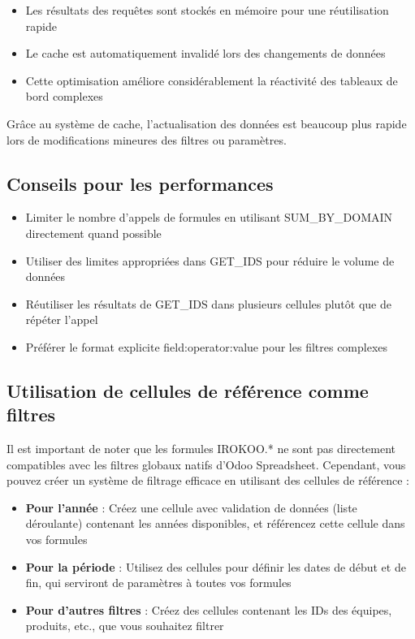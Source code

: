 \documentclass[12pt, a4paper]{article}
\begin{document}
\begin{itemize}
    \item Les résultats des requêtes sont stockés en mémoire pour une réutilisation rapide
    \item Le cache est automatiquement invalidé lors des changements de données
    \item Cette optimisation améliore considérablement la réactivité des tableaux de bord complexes
\end{itemize}

\begin{tip}
Grâce au système de cache, l'actualisation des données est beaucoup plus rapide lors de modifications mineures des filtres ou paramètres.
\end{tip}

\subsection{Conseils pour les performances}
\begin{itemize}
    \item Limiter le nombre d'appels de formules en utilisant SUM\_BY\_DOMAIN directement quand possible
    \item Utiliser des limites appropriées dans GET\_IDS pour réduire le volume de données
    \item Réutiliser les résultats de GET\_IDS dans plusieurs cellules plutôt que de répéter l'appel
    \item Préférer le format explicite field:operator:value pour les filtres complexes
\end{itemize}

\subsection{Utilisation de cellules de référence comme filtres}

Il est important de noter que les formules IROKOO.* ne sont pas directement compatibles avec les filtres globaux natifs d'Odoo Spreadsheet. Cependant, vous pouvez créer un système de filtrage efficace en utilisant des cellules de référence :

\begin{itemize}
    \item \textbf{Pour l'année} : Créez une cellule avec validation de données (liste déroulante) contenant les années disponibles, et référencez cette cellule dans vos formules
    \item \textbf{Pour la période} : Utilisez des cellules pour définir les dates de début et de fin, qui serviront de paramètres à toutes vos formules
    \item \textbf{Pour d'autres filtres} : Créez des cellules contenant les IDs des équipes, produits, etc., que vous souhaitez filtrer
\end{itemize}
\end{document}
